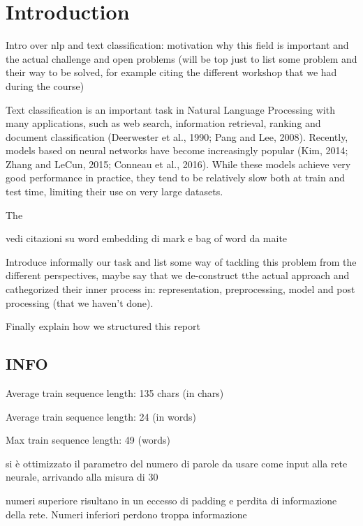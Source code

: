 \section{Introduction} \label{sec:introduction}

Intro over nlp and text classification: motivation why this field is important and the actual challenge and open problems (will be top just to list some problem and their way to be solved, for example citing the different workshop that we had during the course)


Text classification is an important task in Natural Language Processing with many applications, such as web search, information retrieval, ranking and document classification (Deerwester et al., 1990; Pang and Lee, 2008). Recently, models based on neural networks have become increasingly popular (Kim, 2014; Zhang and LeCun, 2015; Conneau et al., 2016). While these models achieve very good performance in practice, they tend to be relatively slow both at train and test time, limiting their use on very large datasets.

The 

vedi citazioni su word embedding di mark e bag of word da maite

Introduce informally our task and list some way of tackling this problem from the different perspectives, maybe say that we de-construct tthe actual approach and cathegorized their inner process in: representation, preprocessing, model and post processing (that we haven't done).

Finally explain how we structured this report

\subsection{INFO}

Average train sequence length: 135 chars (in chars)

Average train sequence length: 24 (in words)

Max train sequence length: 49 (words)

si è ottimizzato il parametro del numero di parole da usare come input alla rete neurale, arrivando alla misura di 30

numeri superiore risultano in un eccesso di padding e perdita di informazione della rete. Numeri inferiori perdono troppa informazione
